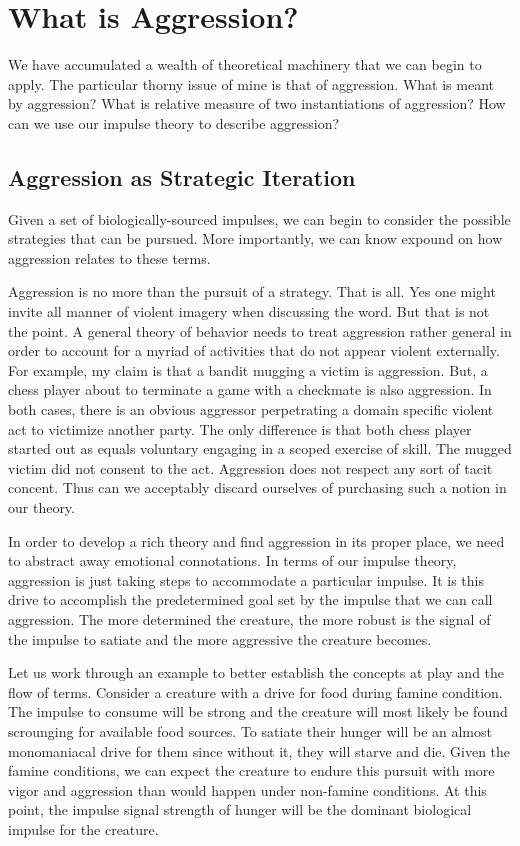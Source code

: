 \documentclass[12pt]{article}
\begin{document}
\section{What is Aggression?}
We have accumulated a wealth of theoretical machinery that we can begin to apply.
The particular thorny issue of mine is that of aggression.
What is meant by aggression?
What is relative measure of two instantiations of aggression?
How can we use our impulse theory to describe aggression?

\subsection{Aggression as Strategic Iteration}
Given a set of biologically-sourced impulses, we can begin to consider the possible strategies that can be pursued.
More importantly, we can know expound on how aggression relates to these terms.

Aggression is no more than the pursuit of a strategy.
That is all.
Yes one might invite all manner of violent imagery when discussing the word.
But that is not the point.
A general theory of behavior needs to treat aggression rather general in order to account for a myriad of activities that do not appear violent externally.
For example, my claim is that a bandit mugging a victim is aggression.
But, a chess player about to terminate a game with a checkmate is also aggression.
In both cases, there is an obvious aggressor perpetrating a domain specific violent act to victimize another party.
The only difference is that both chess player started out as equals voluntary engaging in a scoped exercise of skill.
The mugged victim did not consent to the act.
Aggression does not respect any sort of tacit concent.
Thus can we acceptably discard ourselves of purchasing such a notion in our theory.

In order to develop a rich theory and find aggression in its proper place, we need to abstract away emotional connotations.
In terms of our impulse theory, aggression is just taking steps to accommodate a particular impulse.
It is this drive to accomplish the predetermined goal set by the impulse that we can call aggression.
The more determined the creature, the more robust is the signal of the impulse to satiate and the more aggressive the creature becomes.

Let us work through an example to better establish the concepts at play and the flow of terms.
Consider a creature with a drive for food during famine condition.
The impulse to consume will be strong and the creature will most likely be found scrounging for available food sources.
To satiate their hunger will be an almost monomaniacal drive for them since without it, they will starve and die.
Given the famine conditions, we can expect the creature to endure this pursuit with more vigor and aggression than would happen under non-famine conditions.
At this point, the impulse signal strength of hunger will be the dominant biological impulse for the creature.
\end{document}
